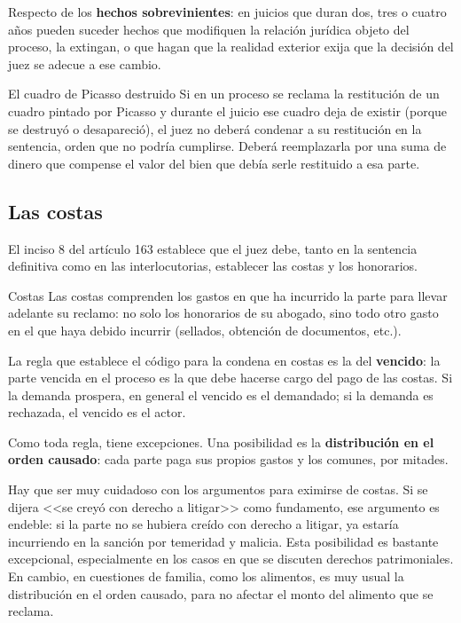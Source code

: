 \documentclass[12pt,oneside]{book}
\begin{document}
Respecto de los \textbf{hechos sobrevinientes}: en juicios que duran dos, tres o cuatro años pueden suceder hechos que modifiquen la relación jurídica objeto del proceso, la extingan, o que hagan que la realidad exterior exija que la decisión del juez se adecue a ese cambio.

\begin{example}{El cuadro de Picasso destruido}
Si en un proceso se reclama la restitución de un cuadro pintado por Picasso y durante el juicio ese cuadro deja de existir (porque se destruyó o desapareció), el juez no deberá condenar a su restitución en la sentencia, orden que no podría cumplirse. Deberá reemplazarla por una suma de dinero que compense el valor del bien que debía serle restituido a esa parte.
\end{example}

\subsection{Las costas}

El inciso 8\textordmasculine{} del artículo 163 establece que el juez debe, tanto en la sentencia definitiva como en las interlocutorias, establecer las costas y los honorarios.

\begin{definition}{Costas}
Las costas comprenden los gastos en que ha incurrido la parte para llevar adelante su reclamo: no solo los honorarios de su abogado, sino todo otro gasto en el que haya debido incurrir (sellados, obtención de documentos, etc.).
\end{definition}

La regla que establece el código para la condena en costas es la del \textbf{vencido}: la parte vencida en el proceso es la que debe hacerse cargo del pago de las costas. Si la demanda prospera, en general el vencido es el demandado; si la demanda es rechazada, el vencido es el actor.

Como toda regla, tiene excepciones. Una posibilidad es la \textbf{distribución en el orden causado}: cada parte paga sus propios gastos y los comunes, por mitades.

\begin{important}
Hay que ser muy cuidadoso con los argumentos para eximirse de costas. Si se dijera <<se creyó con derecho a litigar>> como fundamento, ese argumento es endeble: si la parte no se hubiera creído con derecho a litigar, ya estaría incurriendo en la sanción por temeridad y malicia. Esta posibilidad es bastante excepcional, especialmente en los casos en que se discuten derechos patrimoniales. En cambio, en cuestiones de familia, como los alimentos, es muy usual la distribución en el orden causado, para no afectar el monto del alimento que se reclama.
\end{important}
\end{document}
